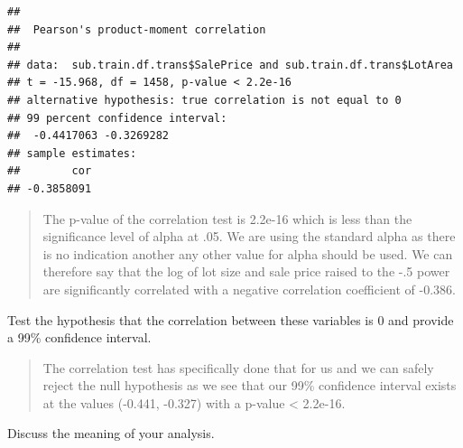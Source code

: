 \documentclass[]{article}
\newenvironment{Shaded}{\begin{snugshade}}{\end{snugshade}}
\newcommand{\KeywordTok}[1]{\textcolor[rgb]{0.13,0.29,0.53}{\textbf{{#1}}}}
\newcommand{\DataTypeTok}[1]{\textcolor[rgb]{0.13,0.29,0.53}{{#1}}}
\newcommand{\DecValTok}[1]{\textcolor[rgb]{0.00,0.00,0.81}{{#1}}}
\newcommand{\StringTok}[1]{\textcolor[rgb]{0.31,0.60,0.02}{{#1}}}
\newcommand{\NormalTok}[1]{{#1}}
\begin{document}
\begin{Shaded}
\end{Shaded}

\begin{verbatim}
## 
##  Pearson's product-moment correlation
## 
## data:  sub.train.df.trans$SalePrice and sub.train.df.trans$LotArea
## t = -15.968, df = 1458, p-value < 2.2e-16
## alternative hypothesis: true correlation is not equal to 0
## 99 percent confidence interval:
##  -0.4417063 -0.3269282
## sample estimates:
##        cor 
## -0.3858091
\end{verbatim}

\begin{quote}
The p-value of the correlation test is 2.2e-16 which is less than the
significance level of alpha at .05. We are using the standard alpha as
there is no indication another any other value for alpha should be used.
We can therefore say that the log of lot size and sale price raised to
the -.5 power are significantly correlated with a negative correlation
coefficient of -0.386.
\end{quote}

Test the hypothesis that the correlation between these variables is 0
and provide a 99\% confidence interval.

\begin{quote}
The correlation test has specifically done that for us and we can safely
reject the null hypothesis as we see that our 99\% confidence interval
exists at the values (-0.441, -0.327) with a p-value \textless{}
2.2e-16.
\end{quote}

Discuss the meaning of your analysis.
\end{document}
